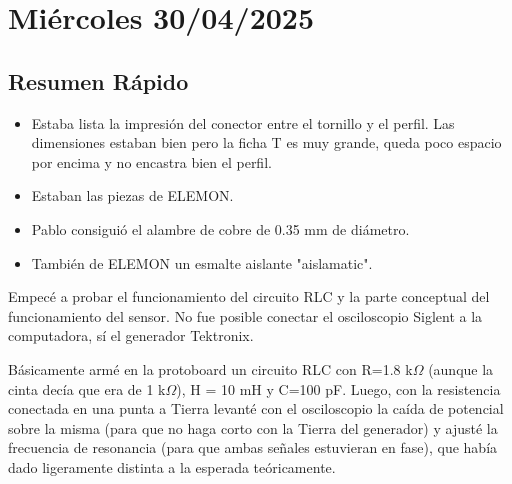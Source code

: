 
\section{Miércoles 30/04/2025}

\subsection*{Resumen Rápido}

\begin{itemize}
	\item Estaba lista la impresión del conector entre el tornillo y el perfil. Las dimensiones estaban bien pero la ficha T es muy grande, queda poco espacio por encima y no encastra bien el perfil.
	\item Estaban las piezas de ELEMON.
	\item Pablo consiguió el alambre de cobre de 0.35 mm de diámetro.
	\item También de ELEMON un esmalte aislante "aislamatic".
\end{itemize}

Empecé a probar el funcionamiento del circuito RLC y la parte conceptual del funcionamiento del sensor. No fue posible conectar el osciloscopio Siglent a la computadora, sí el generador Tektronix. 

Básicamente armé en la protoboard un circuito RLC con R=1.8 k$\Omega$ (aunque la cinta decía que era de 1 k$\Omega$), H = 10 mH y C=100 pF. Luego, con la resistencia conectada en una punta a Tierra levanté con el osciloscopio la caída de potencial sobre la misma (para que no haga corto con la Tierra del generador) y ajusté la frecuencia de resonancia (para que ambas señales estuvieran en fase), que había dado ligeramente distinta a la esperada teóricamente. 

